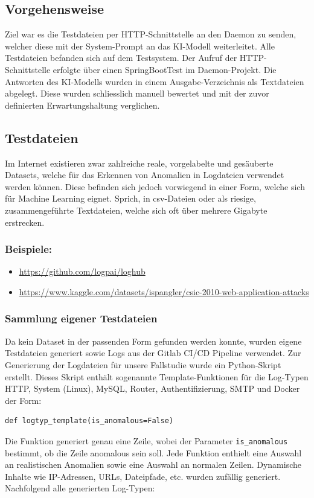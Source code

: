 \documentclass[a4paper,12pt]{report}
\begin{document}
    \subsection{Vorgehensweise}\label{subsec:vorgehensweise}
    Ziel war es die Testdateien per HTTP-Schnittstelle an den Daemon zu senden, welcher diese mit der System-Prompt an das KI-Modell weiterleitet.
    Alle Testdateien befanden sich auf dem Testsystem.
    Der Aufruf der HTTP-Schnittstelle erfolgte über einen SpringBootTest im Daemon-Projekt.
    Die Antworten des KI-Modells wurden in einem Ausgabe-Verzeichnis als Textdateien abgelegt.
    Diese wurden schliesslich manuell bewertet und mit der zuvor definierten Erwartungshaltung verglichen.

    \subsection{Testdateien}\label{subsec:testdateien}
    Im Internet existieren zwar zahlreiche reale, vorgelabelte und gesäuberte Datasets, welche für das Erkennen von Anomalien in Logdateien verwendet werden können.
    Diese befinden sich jedoch vorwiegend in einer Form, welche sich für Machine Learning eignet.
    Sprich, in \gls{csv}-Dateien oder als riesige, zusammengeführte Textdateien, welche sich oft über mehrere Gigabyte erstrecken.

    \subsubsection{Beispiele:}
    \begin{itemize}
        \item \url{https://github.com/logpai/loghub}
        \item \url{https://www.kaggle.com/datasets/ispangler/csic-2010-web-application-attacks}
    \end{itemize}

    \subsubsection{Sammlung eigener Testdateien}
    Da kein Dataset in der passenden Form gefunden werden konnte, wurden eigene Testdateien generiert sowie Logs aus der Gitlab CI/CD Pipeline verwendet.
    Zur Generierung der Logdateien für unsere Fallstudie wurde ein Python-Skript erstellt.
    Dieses Skript enthält sogenannte Template-Funktionen für die Log-Typen HTTP, System (Linux), MySQL, Router, Authentifizierung, SMTP und Docker der Form:
    \begin{verbatim}def logtyp_template(is_anomalous=False)
    \end{verbatim}
    Die Funktion generiert genau eine Zeile, wobei der Parameter \texttt{is\_anomalous} bestimmt, ob die Zeile anomalous sein soll.
    Jede Funktion enthielt eine Auswahl an realistischen Anomalien sowie eine Auswahl an normalen Zeilen.
    Dynamische Inhalte wie IP-Adressen, URLs, Dateipfade, etc. wurden zufällig generiert.
    Nachfolgend alle generierten Log-Typen:
\end{document}
